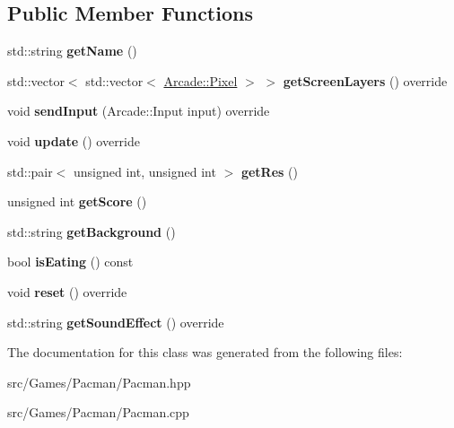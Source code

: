 \subsection*{Public Member Functions}
\begin{DoxyCompactItemize}
\item 
\mbox{\label{class_arcade_1_1_pacman_ae94a4c324525be0937af7bd6c326194b}} 
std\+::string {\bfseries get\+Name} ()
\item 
\mbox{\label{class_arcade_1_1_pacman_a8ce3e1d50b4003f8ceca30eb9a15d311}} 
std\+::vector$<$ std\+::vector$<$ \mbox{\hyperlink{struct_arcade_1_1_pixel}{Arcade\+::\+Pixel}} $>$ $>$ {\bfseries get\+Screen\+Layers} () override
\item 
\mbox{\label{class_arcade_1_1_pacman_ae911e033a81ef3ad0178cd1303b9e2df}} 
void {\bfseries send\+Input} (Arcade\+::\+Input input) override
\item 
\mbox{\label{class_arcade_1_1_pacman_a2e382b9fabef2a49c01fc9ee52de34f1}} 
void {\bfseries update} () override
\item 
\mbox{\label{class_arcade_1_1_pacman_afd65d2a017ada9379f4f76e3b99c9c54}} 
std\+::pair$<$ unsigned int, unsigned int $>$ {\bfseries get\+Res} ()
\item 
\mbox{\label{class_arcade_1_1_pacman_af21245973ba39b98b7f8cc18b23d1abc}} 
unsigned int {\bfseries get\+Score} ()
\item 
\mbox{\label{class_arcade_1_1_pacman_aa2c7a7a0c05c99e23906a4a4196ddb7b}} 
std\+::string {\bfseries get\+Background} ()
\item 
\mbox{\label{class_arcade_1_1_pacman_ae40b68b5eb83a1d4528169c357129f67}} 
bool {\bfseries is\+Eating} () const
\item 
\mbox{\label{class_arcade_1_1_pacman_af4a4bcc2f50e28a785a33bc37a915388}} 
void {\bfseries reset} () override
\item 
\mbox{\label{class_arcade_1_1_pacman_a6dfb2aa4cef6c1f3d79895aaa0e5b6c8}} 
std\+::string {\bfseries get\+Sound\+Effect} () override
\end{DoxyCompactItemize}


The documentation for this class was generated from the following files\+:\begin{DoxyCompactItemize}
\item 
src/\+Games/\+Pacman/Pacman.\+hpp\item 
src/\+Games/\+Pacman/Pacman.\+cpp\end{DoxyCompactItemize}
